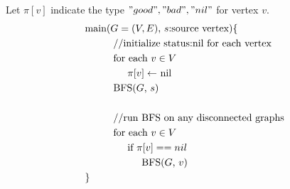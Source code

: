 \documentclass[a4paper]{report}
\begin{document}
\begin{enumerate}
      Let $\pi[v]$ indicate the type $"good", "bad", "nil"$ for vertex $v$.
      \begin{align*}
        &\text{main($G=(V,E)$, $s$:source vertex)\{} \\
        & \hspace{1cm} \text{//initialize status:nil for each vertex}\\
        & \hspace{1cm} \text{for each $v \in V$} \\
        & \hspace{1.5cm} \text{$\pi[v] \leftarrow$ nil} \\
        & \hspace{1cm} \text{BFS($G$, $s$)} \\\\
        & \hspace{1cm} \text{//run BFS on any disconnected graphs}\\
        & \hspace{1cm} \text{for each $v \in V$} \\
        & \hspace{1.5cm} \text{if $\pi[v] == nil$}  \\
        & \hspace{2cm} \text{BFS($G$, $v$)}   \\
        &\text{\}} 
      \end{align*}


\end{enumerate}
\end{document}
